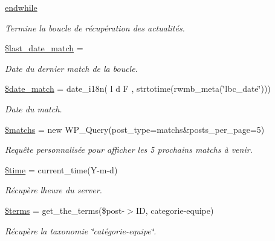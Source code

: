 \begin{DoxyCompactItemize}
\item 
\hyperlink{index_8php_a1b05dae45f9e3f4c1fe86048550d2c5b}{endwhile}
\begin{DoxyCompactList}\small\item\em Termine la boucle de récupération des actualités. \end{DoxyCompactList}\item 
\hyperlink{index_8php_ae59c5fee360f6a47ff7e4847a26a6509}{\$last\+\_\+date\+\_\+match} = \textquotesingle{}\textquotesingle{}
\begin{DoxyCompactList}\small\item\em Date du dernier match de la boucle. \end{DoxyCompactList}\item 
\hyperlink{index_8php_a9dccec06b3547f7c82bc8ade68a042a5}{\$date\+\_\+match} = date\+\_\+i18n(\textquotesingle{} l d F \textquotesingle{}, strtotime(rwmb\+\_\+meta(\char`\"{}lbc\+\_\+date\char`\"{})))
\begin{DoxyCompactList}\small\item\em Date du match. \end{DoxyCompactList}\item 
\hyperlink{index_8php_a957f8b9f1c1240556780615c84d85db3}{\$matchs} = new W\+P\+\_\+\+Query(\textquotesingle{}post\+\_\+type=matchs\&posts\+\_\+per\+\_\+page=5\textquotesingle{})
\begin{DoxyCompactList}\small\item\em Requête personnalisée pour afficher les 5 prochains matchs à venir. \end{DoxyCompactList}\item 
\hyperlink{index_8php_a78db1a0602e3b6ac1d9a1b5ec103c160}{\$time} = current\+\_\+time(\textquotesingle{}Y-\/m-\/d\textquotesingle{})
\begin{DoxyCompactList}\small\item\em Récupère l\textquotesingle{}heure du server. \end{DoxyCompactList}\item 
\hyperlink{index_8php_ad6d756efb764174cfe7a6e9abc97e3eb}{\$terms} = get\+\_\+the\+\_\+terms(\$post-\/$>$ID, \textquotesingle{}categorie-\/equipe\textquotesingle{})
\begin{DoxyCompactList}\small\item\em Récupère la taxonomie \char`\"{}catégorie-\/equipe\char`\"{}. \end{DoxyCompactList}\item 

\end{DoxyCompactItemize}
